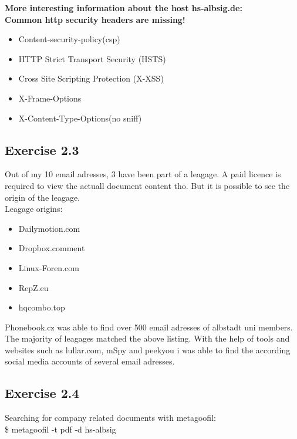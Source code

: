 \documentclass[a4paper,10pt]{article}
\begin{document}
\vspace{5mm}
\noindent \textbf{More interesting information about the host hs-albsig.de:\\
Common http security headers are missing!}\\
\begin{itemize}
\item Content-security-policy(csp)
\item HTTP Strict Transport Security (HSTS)
\item Cross Site Scripting Protection (X-XSS)
\item X-Frame-Options
\item X-Content-Type-Options(no sniff)
 \end{itemize}


\newpage
\subsection{Exercise 2.3}
Out of my 10 email adresses, 3 have been part of a leagage.
A paid licence is required to view the actuall document content tho.
But it is possible to see the origin of the leagage.\\
Leagage origins:
\begin{itemize}
 \item Dailymotion.com
 \item Dropbox.comment
 \item Linux-Foren.com
 \item RepZ.eu
 \item hqcombo.top
\end{itemize}
\vspace{3mm}
Phonebook.cz was able to find over 500 email adresses of albstadt uni members. The majority of leagages matched the above listing.
With the help of tools and websites such as lullar.com, mSpy and peekyou i was able to find the according social media accounts of several email adresses. 
\subsection{Exercise 2.4}
Searching for company related documents with metagoofil:\\
\noindent\$\raisebox{-0.9ex}{\~{}} metagoofil -t pdf -d hs-albsig\\
\end{document}
